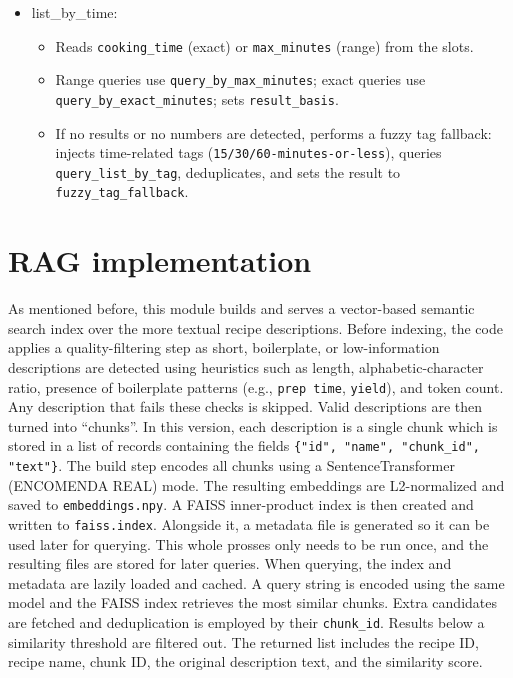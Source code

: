 \documentclass[conference]{IEEEtran}
\begin{document}
\begin{itemize}
\begin{itemize}
      \item list\_by\_time:
        \begin{itemize}
          \item Reads \texttt{cooking\_time} (exact) or \texttt{max\_minutes} (range) from the slots.
          \item Range queries use \texttt{query\_by\_max\_minutes}; exact queries use \texttt{query\_by\_exact\_minutes}; sets \texttt{result\_basis}.
          \item If no results or no numbers are detected, performs a fuzzy tag fallback:
                injects time-related tags (\texttt{15/30/60-minutes-or-less}), queries \texttt{query\_list\_by\_tag}, deduplicates, and sets the result to \texttt{fuzzy\_tag\_fallback}.
        \end{itemize}

    \end{itemize}
\end{itemize}


\section{RAG implementation}


As mentioned before, this module builds and serves a vector-based semantic search index over the more textual recipe descriptions. Before indexing, the code applies a quality-filtering step as short, boilerplate, or low-information descriptions are detected using heuristics such as length, alphabetic-character ratio, presence of boilerplate patterns (e.g., \verb|prep time|, \verb|yield|), and token count. Any description that fails these checks is skipped. Valid descriptions are then turned into “chunks”. 
In this version, each description is a single chunk which is stored in a list of records containing the fields \verb|{"id", "name", "chunk_id", "text"}|.
The build step encodes all chunks using a SentenceTransformer (ENCOMENDA REAL) mode. The resulting embeddings are L2-normalized and saved to \verb|embeddings.npy|. A FAISS inner-product index is then created and written to \verb|faiss.index|. Alongside it, a metadata file is generated so it can be used later for querying. This whole prosses only needs to be run once, and the resulting files are stored for later queries.
When querying, the index and metadata are lazily loaded and cached. A query string is encoded using the same model and the FAISS index retrieves the most similar chunks. Extra candidates are fetched and deduplication is employed by their \verb|chunk_id|. Results below a similarity threshold are filtered out. The returned list includes the recipe ID, recipe name, chunk ID, the original description text, and the similarity score. 
\end{document}
